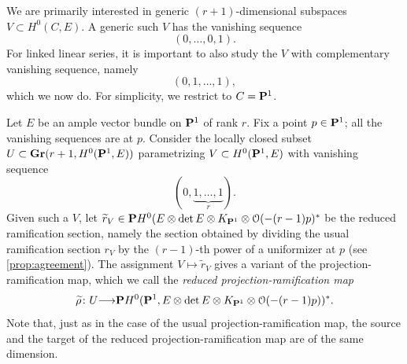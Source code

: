 \documentclass[11pt,reqno]{amsart}
\theoremstyle{plain}
\theoremstyle{definition}
\theoremstyle{remark}
\numberwithin{equation}{section}
\renewcommand{\to}{{\longrightarrow}}
\numberwithin{equation}{section}
\renewcommand{\O}{\mathcal O}
\begin{document}
We are primarily interested in generic $(r+1)$-dimensional subspaces $V \subset H^0(C, E)$.
A generic such $V$ has the vanishing sequence
\[ (0, \dots, 0, 1).\]
For linked linear series, it is important to also study the $V$ with complementary vanishing sequence, namely
\[ (0,1, \dots, 1),\]
which we now do.
For simplicity, we restrict to $C = \P^1$.

Let $E$ be an ample vector bundle on $\P^1$ of rank $r$.
Fix a point $p \in \P^1$; all the vanishing sequences are at $p$.
Consider  the locally closed subset $U \subset \Gr(r+1, H^0(\P^1, E))$ parametrizing $V \subset H^0(\P^1, E)$ with vanishing sequence
\[ (0,\underbrace{1,\dots, 1}_{r}).\]
Given such a $V$, let $\widetilde r_V \in \P H^0(E \otimes \det E \otimes K_{\P^1} \otimes \O(-(r-1)p)^*$ be the reduced ramification section, namely the section obtained by dividing the usual ramification section $r_V$ by the $(r-1)$-th power of a uniformizer at $p$ (see \autoref{prop:agreement}).
The assignment $V \mapsto \widetilde r_V$ gives a variant of the projection-ramification map, which we call the \emph{reduced projection-ramification map}
\begin{equation}\label{eqn:rrd}
  \widetilde \rho \from U \to \P H^0(\P^1, E \otimes \det E \otimes K_{\P^1} \otimes \O(-(r-1)p))^*.
\end{equation}
Note that, just as in the case of the usual projection-ramification map, the source and the target of the reduced projection-ramification map are of the same dimension.
\end{document}
